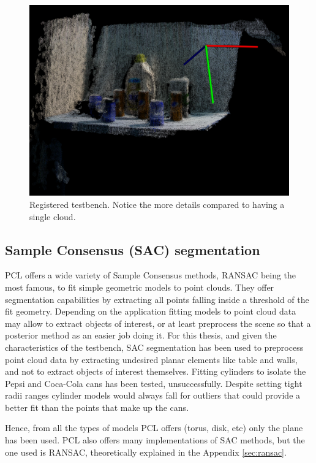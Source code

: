 \documentclass[../main.tex]{subfiles}
\begin{document}
\begin{figure}[htbp]
    \centering
    \includegraphics[width=1\textwidth]{images/registered_testbench.png}
    \caption{Registered testbench. Notice the more details compared to having a single cloud.}
    \label{fig:registered_testbench}
\end{figure}



\subsection{Sample Consensus (SAC) segmentation} \label{sec:sac_segmentation}
PCL offers a wide variety of Sample Consensus methods, RANSAC being the most famous, to fit simple geometric models to point clouds. They offer segmentation capabilities by extracting all points falling inside a threshold of the fit geometry. Depending on the application fitting models to point cloud data may allow to extract objects of interest, or at least preprocess the scene so that a posterior method as an easier job doing it. For this thesis, and given the characteristics of the testbench, SAC segmentation has been used to preprocess point cloud data by extracting undesired planar elements like table and walls, and not to extract objects of interest themselves. Fitting cylinders to isolate the Pepsi and Coca-Cola cans has been tested, unsuccessfully. Despite setting tight radii ranges cylinder models would always fall for outliers that could provide a better fit than the points that make up the cans.

Hence, from all the types of models PCL offers (torus, disk, etc) only the plane has been used. PCL also offers many implementations of SAC methods, but the one used is RANSAC, theoretically explained in the Appendix \ref{sec:ransac}.
\end{document}
